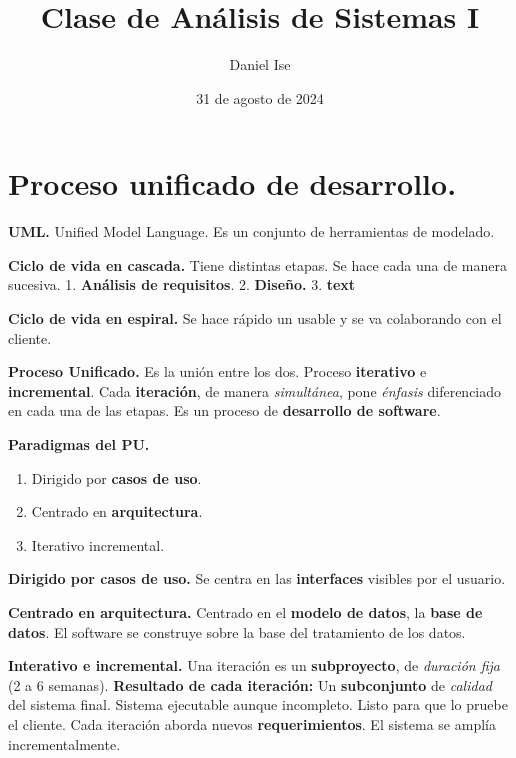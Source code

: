 \documentclass{article}
\title{Clase de Análisis de Sistemas I}
\author{Daniel Ise}
\date{31 de agosto de 2024}
\begin{document}
\maketitle

\section*{Proceso unificado de desarrollo.}

\textbf{UML.} Unified Model Language.
Es un conjunto de herramientas de modelado.

\textbf{Ciclo de vida en cascada.} 
Tiene distintas etapas. 
Se hace cada una de manera sucesiva.
1. \textbf{Análisis de requisitos}.
2. \textbf{Diseño.}
3. \textbf{text}

\textbf{Ciclo de vida en espiral.} 
Se hace rápido un usable y se va colaborando con el cliente.

\textbf{Proceso Unificado.} 
Es la unión entre los dos. 
Proceso \textbf{iterativo} e \textbf{incremental}.
Cada \textbf{iteración}, de manera \textit{simultánea}, 
pone \textit{énfasis} diferenciado en cada una de las etapas.
Es un proceso de \textbf{desarrollo de software}.

\textbf{Paradigmas del PU.}

\begin{enumerate}
    \item Dirigido por \textbf{casos de uso}.
    \item Centrado en \textbf{arquitectura}.
    \item Iterativo incremental.
\end{enumerate}

\textbf{Dirigido por casos de uso.} 
Se centra en las \textbf{interfaces} visibles por el usuario.

\textbf{Centrado en arquitectura.}
Centrado en el \textbf{modelo de datos}, la \textbf{base de datos}. 
El software se construye sobre la base del tratamiento de los datos.

\textbf{Interativo e incremental.}
Una iteración es un \textbf{subproyecto}, 
de \textit{duración fija} (2 a 6 semanas).
\textbf{Resultado de cada iteración:} 
Un \textbf{subconjunto} de \textit{calidad} del sistema final.
Sistema ejecutable aunque incompleto.
Listo para que lo pruebe el cliente.
Cada iteración aborda nuevos \textbf{requerimientos}.
El sistema se amplía incrementalmente.
\end{document}
